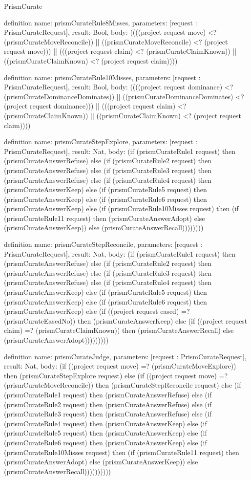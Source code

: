 \begin{lexlean}{PrismCurate}
\begin{semanticmodule}
definition{
  name: prismCurateRule8Misses,
  parameters: [request : PrismCurateRequest],
  result: Bool,
  body: ((((project request move) <? (prismCurateMoveReconcile)) || ((prismCurateMoveReconcile) <? (project request move))) || (((project request claim) <? (prismCurateClaimKnown)) || ((prismCurateClaimKnown) <? (project request claim))))
}

definition{
  name: prismCurateRule10Misses,
  parameters: [request : PrismCurateRequest],
  result: Bool,
  body: ((((project request dominance) <? (prismCurateDominanceDominates)) || ((prismCurateDominanceDominates) <? (project request dominance))) || (((project request claim) <? (prismCurateClaimKnown)) || ((prismCurateClaimKnown) <? (project request claim))))
}

definition{
  name: prismCurateStepExplore,
  parameters: [request : PrismCurateRequest],
  result: Nat,
  body: (if (prismCurateRule1 request) then (prismCurateAnswerRefuse) else (if (prismCurateRule2 request) then (prismCurateAnswerRefuse) else (if (prismCurateRule3 request) then (prismCurateAnswerRefuse) else (if (prismCurateRule4 request) then (prismCurateAnswerKeep) else (if (prismCurateRule5 request) then (prismCurateAnswerKeep) else (if (prismCurateRule6 request) then (prismCurateAnswerKeep) else (if (prismCurateRule10Misses request) then (if (prismCurateRule11 request) then (prismCurateAnswerAdopt) else (prismCurateAnswerKeep)) else (prismCurateAnswerRecall))))))))
}

definition{
  name: prismCurateStepReconcile,
  parameters: [request : PrismCurateRequest],
  result: Nat,
  body: (if (prismCurateRule1 request) then (prismCurateAnswerRefuse) else (if (prismCurateRule2 request) then (prismCurateAnswerRefuse) else (if (prismCurateRule3 request) then (prismCurateAnswerRefuse) else (if (prismCurateRule4 request) then (prismCurateAnswerKeep) else (if (prismCurateRule5 request) then (prismCurateAnswerKeep) else (if (prismCurateRule6 request) then (prismCurateAnswerKeep) else (if ((project request eased) =? (prismCurateEasedNo)) then (prismCurateAnswerKeep) else (if ((project request claim) =? (prismCurateClaimKnown)) then (prismCurateAnswerRecall) else (prismCurateAnswerAdopt)))))))))
}

definition{
  name: prismCurateJudge,
  parameters: [request : PrismCurateRequest],
  result: Nat,
  body: (if ((project request move) =? (prismCurateMoveExplore)) then (prismCurateStepExplore request) else (if ((project request move) =? (prismCurateMoveReconcile)) then (prismCurateStepReconcile request) else (if (prismCurateRule1 request) then (prismCurateAnswerRefuse) else (if (prismCurateRule2 request) then (prismCurateAnswerRefuse) else (if (prismCurateRule3 request) then (prismCurateAnswerRefuse) else (if (prismCurateRule4 request) then (prismCurateAnswerKeep) else (if (prismCurateRule5 request) then (prismCurateAnswerKeep) else (if (prismCurateRule6 request) then (prismCurateAnswerKeep) else (if (prismCurateRule10Misses request) then (if (prismCurateRule11 request) then (prismCurateAnswerAdopt) else (prismCurateAnswerKeep)) else (prismCurateAnswerRecall))))))))))
}


\end{semanticmodule}
\end{lexlean}
